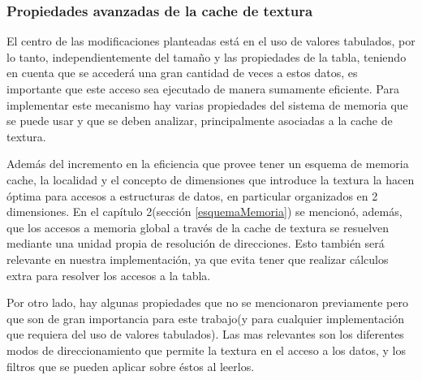 \subsubsection{Propiedades avanzadas de la cache de textura} \label{texturaDetallado}

El centro de las modificaciones planteadas está en el uso de valores tabulados, por lo tanto, independientemente del tamaño y las propiedades de la tabla, teniendo en cuenta que se accederá una gran cantidad de veces a estos datos, 
es importante que este acceso sea ejecutado de manera sumamente eficiente.
Para implementar este mecanismo hay varias propiedades del sistema de memoria que se puede usar y que se deben analizar, principalmente asociadas a la cache de textura. 

Además del incremento en la eficiencia que provee tener un esquema de memoria cache, la localidad y el concepto de dimensiones que introduce la textura la hacen óptima para accesos a estructuras de datos, 
en particular organizados en 2 dimensiones. En el capítulo 2(sección \ref{esquemaMemoria}) se mencionó, además, que los accesos a memoria global a través de la cache de textura se resuelven mediante una unidad propia de resoluci\'on de direcciones. 
Esto también será relevante en nuestra implementación, ya que evita tener que realizar cálculos extra para resolver los accesos a la tabla.

Por otro lado, hay algunas propiedades que no se mencionaron previamente pero que son de gran importancia para este trabajo(y para cualquier implementación que requiera del uso de valores tabulados). 
Las mas relevantes son los diferentes modos de direccionamiento que permite la textura en el acceso a los datos, y los filtros que se pueden aplicar sobre éstos al leerlos. 

